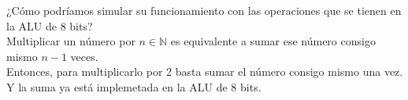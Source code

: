 \documentclass{article}
\begin{document}
\begin{enumerate}
            ¿Cómo podríamos simular su funcionamiento con las operaciones que se 
            tienen en la ALU de 8 bits? \\
            Multiplicar un número por $n \in \mathbb{N}$ es equivalente a sumar ese 
            número consigo mismo $n-1$ veces. \\
            Entonces, para multiplicarlo por 2 basta sumar el número consigo 
            mismo una vez. \\
            Y la suma ya está implemetada en la ALU de 8 bits.
      
                 
    \end{enumerate}
  
    
    
\end{document}
